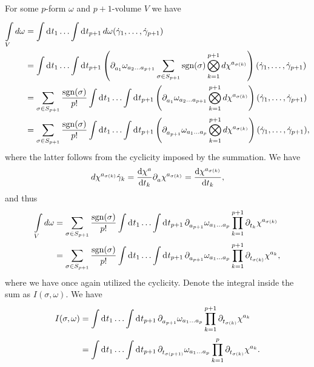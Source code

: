For some $p$-form $\omega$ and $p + 1$-volume $V$ we have
\begin{align*}
\minteg{V}{d\omega} &= \integ{}{}{t_{1}}{\dots \integ{}{}{t_{p + 1}}{d\omega(\dot{\gamma}_{1},\dots, \dot{\gamma}_{p + 1})}} \\
&= \integ{}{}{t_{1}}{\dots \integ{}{}{t_{p + 1}}{\left(\del{a_{1}}{\omega_{a_{2}\dots a_{p + 1}}}\sum\limits_{\sigma\in S_{p + 1}}\text{sgn}(\sigma)\bigotimes_{k = 1}^{p + 1}d\chi^{a_{\sigma(k)}}\right)(\dot{\gamma}_{1},\dots, \dot{\gamma}_{p + 1})}} \\
&= \sum\limits_{\sigma\in S_{p + 1}}\frac{\text{sgn}(\sigma)}{p!}\integ{}{}{t_{1}}{\dots \integ{}{}{t_{p + 1}}{\left(\del{a_{1}}{\omega_{a_{2}\dots a_{p + 1}}}\bigotimes_{k = 1}^{p + 1}d\chi^{a_{\sigma(k)}}\right)(\dot{\gamma}_{1},\dots, \dot{\gamma}_{p + 1})}} \\
&= \sum\limits_{\sigma\in S_{p + 1}}\frac{\text{sgn}(\sigma)}{p!}\integ{}{}{t_{1}}{\dots \integ{}{}{t_{p + 1}}{\left(\del{a_{p + 1}}{\omega_{a_{1}\dots a_{p}}}\bigotimes_{k = 1}^{p + 1}d\chi^{a_{\sigma(k)}}\right)(\dot{\gamma}_{1},\dots, \dot{\gamma}_{p + 1})}},
\end{align*}
where the latter follows from the cyclicity imposed by the summation. We have
\begin{align*}
d\chi^{a_{\sigma(k)}}{\dot{\gamma}_{k}} = \dv{\chi^{a}}{t_{k}}\partial^{}_{a}\chi^{a_{\sigma(k)}} = \dv{\chi^{a_{\sigma(k)}}}{t_{k}},
\end{align*}
and thus
\begin{align*}
\minteg{V}{d\omega} &= \sum\limits_{\sigma\in S_{p + 1}}\frac{\text{sgn}(\sigma)}{p!}\integ{}{}{t_{1}}{\dots \integ{}{}{t_{p + 1}}{\del{a_{p + 1}}{\omega_{a_{1}\dots a_{p}}}\prod\limits_{k = 1}^{p + 1}\del{t_{k}}{\chi^{a_{\sigma(k)}}}}} \\
&= \sum\limits_{\sigma\in S_{p + 1}}\frac{\text{sgn}(\sigma)}{p!}\integ{}{}{t_{1}}{\dots \integ{}{}{t_{p + 1}}{\del{a_{p + 1}}{\omega_{a_{1}\dots a_{p}}}\prod\limits_{k = 1}^{p + 1}\del{t_{\sigma(k)}}{\chi^{a_{k}}}}},
\end{align*}
where we have once again utilized the cyclicity. Denote the integral inside the sum as $I(\sigma, \omega)$. We have
\begin{align*}
I(\sigma, \omega) &= \integ{}{}{t_{1}}{\dots \integ{}{}{t_{p + 1}}{\del{a_{p + 1}}{\omega_{a_{1}\dots a_{p}}}\prod\limits_{k = 1}^{p + 1}\del{t_{\sigma(k)}}{\chi^{a_{k}}}}} \\
&= \integ{}{}{t_{1}}{\dots \integ{}{}{t_{p + 1}}{\del{t_{\sigma(p + 1)}}{\omega_{a_{1}\dots a_{p}}}\prod\limits_{k = 1}^{p}\del{t_{\sigma(k)}}{\chi^{a_{k}}}}}.
\end{align*}
